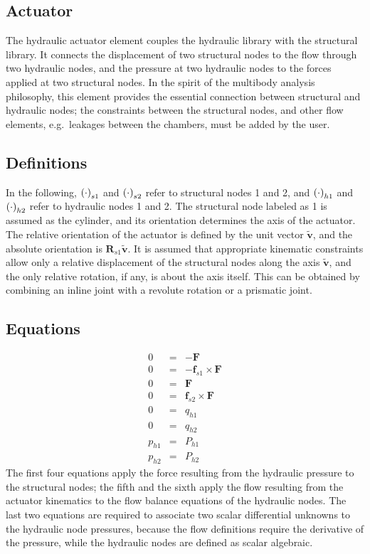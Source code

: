 \documentclass[10pt,dvips,fleqn,subeqn]{report}
\newcommand{\T}[1]{\bm{\mathbf{#1}}}
\begin{document}
\subsection{Actuator}
The hydraulic actuator element couples the hydraulic library 
with the structural library.
It connects the displacement of two structural nodes to the flow
through two hydraulic nodes, and the pressure at two hydraulic nodes
to the forces applied at two structural nodes.
In the spirit of the multibody analysis philosophy, this element
provides the essential connection between structural 
and hydraulic nodes; the constraints between the structural nodes, 
and other flow elements, e.g.\ leakages between the chambers, 
must be added by the user.

\subsection{Definitions}
In the following, $\left( \cdot \right)_{s1}$ and $\left( \cdot \right)_{s2}$
refer to structural nodes 1 and 2, 
and $\left( \cdot \right)_{h1}$ and $\left( \cdot \right)_{h2}$
refer to hydraulic nodes 1 and 2.
The structural node labeled as 1 is assumed as the cylinder,
and its orientation determines the axis of the actuator.
The relative orientation of the actuator is defined by the unit vector
$\tilde{\T{v}}$, and the absolute orientation is $\T{R}_{s1} \tilde{\T{v}}$.
It is assumed that appropriate kinematic constraints allow only 
a relative displacement of the structural nodes along 
the axis $\tilde{\T{v}}$, and the only relative rotation, 
if any, is about the axis itself.
This can be obtained by combining an inline joint with 
a revolute rotation or a prismatic joint.

\subsection{Equations}
\begin{eqnarray*}
	0 & = & -\T{F} \\
	0 & = & -\T{f}_{s1}\times\T{F} \\
	0 & = & \T{F} \\
	0 & = & \T{f}_{s2}\times\T{F} \\
	0 & = & q_{h1} \\
	0 & = & q_{h2} \\
	p_{h1} & = & P_{h1} \\
	p_{h2} & = & P_{h2}
\end{eqnarray*}
The first four equations apply the force resulting from the hydraulic 
pressure to the structural nodes; the fifth and the sixth apply 
the flow resulting from the actuator kinematics to the flow balance
equations of the hydraulic nodes.
The last two equations are required to associate two scalar
differential unknowns to the hydraulic node pressures, because 
the flow definitions require the derivative of the pressure, 
while the hydraulic nodes are defined as scalar algebraic.
\end{document}
